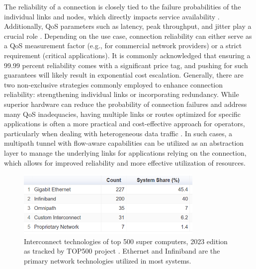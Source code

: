 The reliability of a connection is closely tied to the failure probabilities of the individual links and nodes, which directly impacts service availability \cite{shooman_algorithms_1995}. 
Additionally, \ac{QoS} parameters such as latency, peak throughput, and jitter play a crucial role \cite{gozdecki_quality_2003}.
Depending on the use case, connection reliability can either serve as a \ac{QoS} measurement factor (e.g., for commercial network providers) or a strict requirement (critical applications). 
It is commonly acknowledged that ensuring a 99.99 percent reliability comes with a significant price tag, and pushing for such guarantees will likely result in exponential cost escalation.
Generally, there are two non-exclusive strategies commonly employed to enhance connection reliability: strengthening individual links or incorporating redundancy.
While superior hardware can reduce the probability of connection failures and address many \ac{QoS} inadequacies, having multiple links or routes optimized for specific applications is often a more practical and cost-effective approach for operators, particularly when dealing with heterogeneous data traffic \cite{chen_overview_1998}.
In such cases, a multipath tunnel with flow-aware capabilities can be utilized as an abstraction layer to manage the underlying links for applications relying on the connection, which allows for improved reliability and more effective utilization of resources. 


\begin{figure}[H]
	\centering
	\includegraphics[width=0.8\textwidth]{resources/images/Interconnect_Technologies_500_supercomp.PNG}
	\caption{Interconnect technologies of top 500 super computers, 2023 edition as tracked by TOP500 project \cite{Interconnect_Technologies_500_supercomp}. Ethernet and Infiniband are the primary network technologies utilized in most systems.}
    \label{fig:introduction:Interconnect_Technologies_500_supercomp}
\end{figure}

